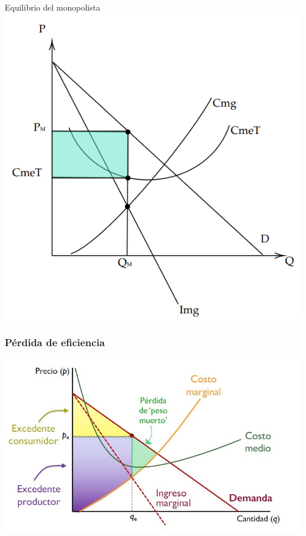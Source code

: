 \documentclass{beamer}
\begin{document}
\begin{frame}{Equilibrio del monopolista}
    \centering
    \includegraphics[scale=0.6]{../Figures/C22.5.png}
\end{frame}

\begin{frame}
    \frametitle{Pérdida de eficiencia}
    \includegraphics[scale=0.6]{../Figures/Tema_06.42_excedente5.jpg}
\end{frame}
\end{document}
